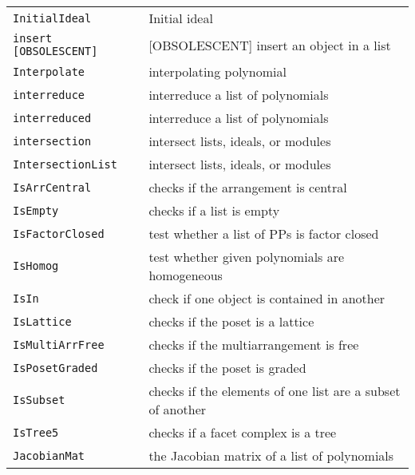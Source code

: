 \documentclass[a4paper]{mybook}
\begin{document}
\begin{center}
\begin{longtable}{ll}
{\verb~InitialIdeal~} &
      Initial ideal\\
   
{\verb~insert [OBSOLESCENT]~} &
      [OBSOLESCENT] insert an object in a list\\
   
{\verb~Interpolate~} &
      interpolating polynomial\\
   
{\verb~interreduce~} &
      interreduce a list of polynomials\\
   
{\verb~interreduced~} &
      interreduce a list of polynomials\\
   
{\verb~intersection~} &
      intersect lists, ideals, or modules\\
   
{\verb~IntersectionList~} &
      intersect lists, ideals, or modules\\
   
{\verb~IsArrCentral~} &
      checks if the arrangement is central\\
   
{\verb~IsEmpty~} &
      checks if a list is empty\\
   
{\verb~IsFactorClosed~} &
      test whether a list of PPs is factor closed\\
   
{\verb~IsHomog~} &
      test whether given polynomials are homogeneous\\
   
{\verb~IsIn~} &
      check if one object is contained in another\\
   
{\verb~IsLattice~} &
      checks if the poset is a lattice\\
   
{\verb~IsMultiArrFree~} &
      checks if the multiarrangement is free\\
   
{\verb~IsPosetGraded~} &
      checks if the poset is graded\\
   
{\verb~IsSubset~} &
      checks if the elements of one list are a subset of another\\
   
{\verb~IsTree5~} &
      checks if a facet complex is a tree\\
   
{\verb~JacobianMat~} &
      the Jacobian matrix of a list of polynomials\\
   

\end{longtable}
\end{center}
\end{document}
